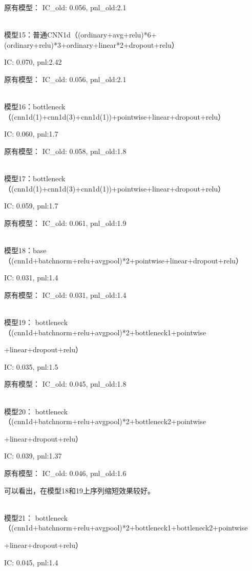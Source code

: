 \documentclass[11pt]{ctexart}
\begin{document}
原有模型：
{\kaishu \small IC\_old: 0.056, pnl\_old:2.1}

~\\
模型15：普通CNN1d（(ordinary+avg+relu)*6+(ordinary+relu)*3+ordinary+linear*2+dropout+relu）

{\kaishu \small IC: 0.070, pnl:2.42}

原有模型：
{\kaishu \small IC\_old: 0.056, pnl\_old:2.1}

~\\
模型16：bottleneck（(cnn1d(1)+cnn1d(3)+cnn1d(1))+pointwise+linear+dropout+relu）

{\kaishu \small IC: 0.060, pnl:1.7}

原有模型：
{\kaishu \small IC\_old: 0.058, pnl\_old:1.8}

~\\
模型17：bottleneck（(cnn1d(1)+cnn1d(3)+cnn1d(1))+pointwise+linear+dropout+relu）


{\kaishu \small IC: 0.059, pnl:1.7}

原有模型：
{\kaishu \small IC\_old: 0.061, pnl\_old:1.9}

~\\
模型18：base（(cnn1d+batchnorm+relu+avgpool)*2+pointwise+linear+dropout+relu）

{\kaishu \small IC: 0.031, pnl:1.4}

原有模型：
{\kaishu \small IC\_old: 0.031, pnl\_old:1.4}

~\\
模型19： bottleneck（(cnn1d+batchnorm+relu+avgpool)*2+bottleneck1+pointwise

+linear+dropout+relu）

{\kaishu \small IC: 0.035, pnl:1.5}

原有模型：
{\kaishu \small IC\_old: 0.045, pnl\_old:1.8}

~\\
模型20： bottleneck（(cnn1d+batchnorm+relu+avgpool)*2+bottleneck2+pointwise

+linear+dropout+relu）

{\kaishu \small IC: 0.039, pnl:1.37}

原有模型：
{\kaishu \small IC\_old: 0.046, pnl\_old:1.6}

可以看出，在模型18和19上序列缩短效果较好。

~\\
模型21： bottleneck（(cnn1d+batchnorm+relu+avgpool)*2+bottleneck1+bottleneck2+pointwise

+linear+dropout+relu）

{\kaishu \small IC: 0.045, pnl:1.4}
\end{document}
